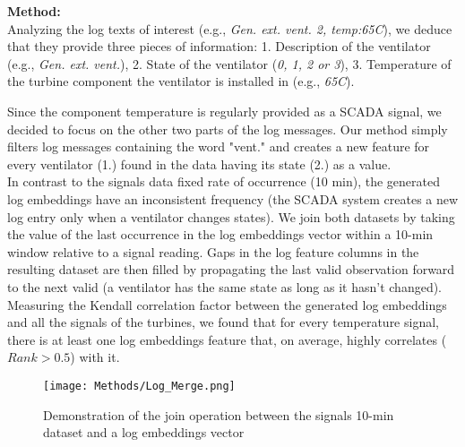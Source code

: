     \begin{flushleft}
      \textbf{Method:}\\
      Analyzing the log texts of interest (e.g., \emph{Gen. ext. vent. 2, temp:65\degree C}), we deduce that they provide three pieces of information: 
      1. Description of the ventilator (e.g., \emph{Gen. ext. vent.}), 2. State of the ventilator (\emph{0, 1, 2 or 3}), 
      3. Temperature of the turbine component the ventilator is installed in (e.g., \emph{65\degree C}).
    \end{flushleft}
    Since the component temperature is regularly provided as a SCADA signal, we decided to focus on the other two parts of the log messages. 
    Our method simply filters log messages containing the word "vent." and creates a new feature for every ventilator (1.) found in the data having its state (2.) as a value.\\
    In contrast to the signals data fixed rate of occurrence (10 min), the generated log embeddings have an inconsistent frequency (the SCADA system creates a new log entry only 
    when a ventilator changes states). We join both datasets by taking the value of the last occurrence in the log embeddings vector within a 10-min window relative to a signal reading. 
    Gaps in the log feature columns in the resulting dataset are then filled by propagating the last valid observation forward to the next valid (a ventilator has the same state as long as it hasn't changed).\\
    Measuring the Kendall correlation factor between the generated log embeddings and all the signals of the turbines, we found that for every temperature signal, there is at least 
    one log embeddings feature that, on average, highly correlates ($Rank>0.5$) with it.

    \begin{figure}[!htbp]
      \begin{center}
        \texttt{[image: Methods/Log\_Merge.png]}
      \end{center}
      \caption{Demonstration of the join operation between the signals 10-min dataset and a log embeddings vector}
      \label{fig:log-merge}
    \end{figure}
    

